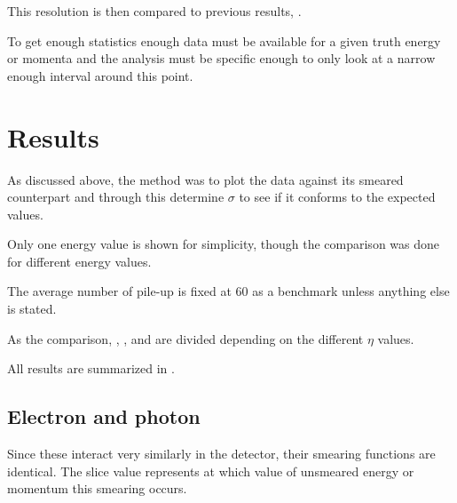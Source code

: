This resolution is then compared to previous results, \citep{ATL-PHYS-PUB-2013-004}.

To get enough statistics enough data must be available for a given truth energy or momenta and the analysis must be specific enough to only look at a narrow enough interval around this point.
\newpage
\section{Results}\label{cha:vali:sec:results}
As discussed above, the method was to plot the data against its smeared counterpart and through this determine $\sigma$ to see if it conforms to the expected values.

Only one energy value is shown for simplicity, though the comparison was done for different energy values.

The average number of pile-up is fixed at 60 as a benchmark unless anything else is stated.

As the comparison, , ,  and  are divided depending on the different $\eta$ values.

All results are summarized in . 
\newpage
\subsection{Electron and photon}
Since these interact very  similarly in the detector, their smearing functions are identical.
The slice value represents at which value of unsmeared energy or momentum this smearing occurs. 


